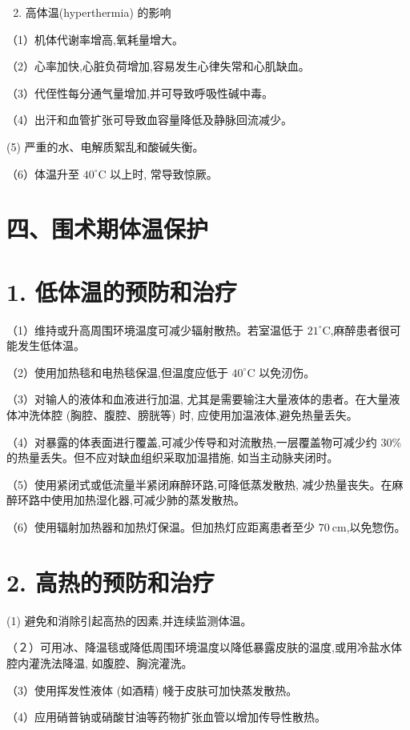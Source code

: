 \documentclass[10pt]{article}
\begin{document}
\begin{enumerate}
  \setcounter{enumi}{1}
  \item 高体温(hyperthermia) 的影响
\end{enumerate}

（1）机体代谢率增高,氧耗量增大。

（2）心率加快,心脏负荷增加,容易发生心律失常和心肌缺血。

（3）代侄性每分通气量增加,并可导致呼吸性碱中毒。

（4）出汗和血管扩张可导致血容量降低及静脉回流减少。

(5) 严重的水、电解质絮乱和酸碱失衡。

（6）体温升至 $40^{\circ} \mathrm{C}$ 以上时, 常导致惊厥。

\section*{四、围术期体温保护}
\section*{1. 低体温的预防和治疗}
（1）维持或升高周围环境温度可减少辐射散热。若室温低于 $21^{\circ} \mathrm{C}$,麻醉患者很可能发生低体温。

（2）使用加热毯和电热毯保温,但温度应低于 $40^{\circ} \mathrm{C}$ 以免㲽伤。

（3）对输人的液体和血液进行加温, 尤其是需要输注大量液体的患者。在大量液体冲洗体腔 (胸腔、腹腔、膀胱等) 时, 应使用加温液体,避免热量丢失。

（4）对暴露的体表面进行覆盖,可减少传导和对流散热,一层覆盖物可减少约 $30 \%$ 的热量丢失。但不应对缺血组织采取加温措施, 如当主动脉夹闭时。

（5）使用紧闭式或低流量半紧闭麻醉环路,可降低蒸发散热, 减少热量丧失。在麻醉环路中使用加热湿化器,可减少肺的蒸发散热。

（6）使用辐射加热器和加热灯保温。但加热灯应距离患者至少 $70 \mathrm{~cm}$,以免惣伤。

\section*{2. 高热的预防和治疗}
(1) 避免和消除引起高热的因素,并连续监测体温。

（２）可用冰、降温毯或降低周围环境温度以降低暴露皮肤的温度,或用冷盐水体腔内灌洗法降温, 如腹腔、胸浣灌洗。

（3）使用挥发性液体 (如酒精) 帴于皮肤可加快蒸发散热。

（4）应用硝普钠或硝酸甘油等药物扩张血管以增加传导性散热。
\end{document}
